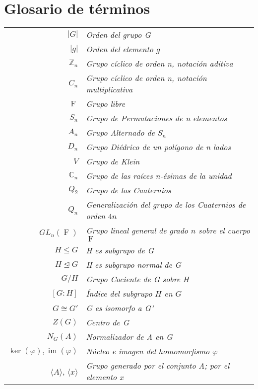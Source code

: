 \chapter*{Glosario de términos}

\begin{table}[H]
\begin{tabular}{r|l}
$|G|$ & \textit{Orden del grupo G}    \\
$|g|$ & \textit{Orden del elemento $g$} \\
$\mathbb{Z}_n$ & \textit{Grupo cíclico de orden n, notación aditiva} \\
$C_n$ & \textit{Grupo cíclico de orden n, notación multiplicativa}\\
$\operatorname{F}$ & \textit{Grupo libre} \\
$S_n$ & \textit{Grupo de Permutaciones de n elementos}\\
$A_n$ & \textit{Grupo Alternado de $S_n$}\\
$D_n$ & \textit{Grupo Diédrico de un polígono de n lados} \\
$V$ & \textit{Grupo de Klein} \\
$\mathbb{C}_n$ & \textit{Grupo de las raíces n-ésimas de la unidad} \\
$Q_2$ & \textit{Grupo de los Cuaternios} \\
$Q_n$ & \textit{Generalización del grupo de los Cuaternios de orden $4n$} \\
$GL_n(\operatorname{F})$ & \textit{Grupo lineal general de grado $n$ sobre el cuerpo $\operatorname{F}$} \\
$H\leq G$ & \textit{H es subgrupo de G}\\
$H \trianglelefteq G$ & \textit{H es subgrupo normal de G} \\
$G/H$ & \textit{Grupo Cociente de G sobre H} \\
$[G:H]$ & \textit{Índice del subgrupo $H$ en $G$} \\
$G \cong G'$ & \textit{G es isomorfo a G'}\\
$Z(G)$ & \textit{Centro de G} \\
$N_G(A)$ & \textit{Normalizador de A en G} \\
$\operatorname{ker}(\varphi), \operatorname{im}(\varphi)$ & \textit{Núcleo e imagen del  homomorfismo $\varphi$} \\
$ \langle A \rangle$,  $\langle x \rangle$ & \textit{Grupo generado por el conjunto A; por el elemento x} \\

\end{tabular}
\end{table}
